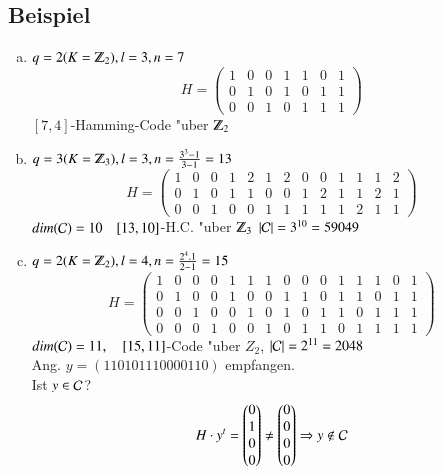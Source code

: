 %
%
\subsection{Beispiel}
\begin{enumerate}[a)]
	\item $q=2 (K= \Z_2), l=3, n=7$
	\[
	H=\begin{pmatrix}
		1 & 0 & 0 & 1 & 1 & 0 & 1 \\ 
		0 & 1 & 0 & 1 & 0 & 1 & 1 \\ 
		0 & 0 & 1 & 0 & 1 & 1 & 1
	\end{pmatrix}
	\]
	$[7,4]$-Hamming-Code "uber $\Z_2$
	\item  $q=3 (K= \Z_3), l=3, n=\frac{3^3-1}{3-1}=13$
	\[H=
	\begin{pmatrix}
		1 & 0 & 0 & 1 & 2 & 1 & 2 & 0 & 0 & 1 & 1 & 1 & 2 \\ 
		0 & 1 & 0 & 1 & 1 & 0 & 0 & 1 & 2 & 1 & 1 & 2 & 1 \\ 
		0 & 0 & 1 & 0 & 0 & 1 & 1 & 1 & 1 & 1 & 2 & 1 & 1
	\end{pmatrix}
	\]
	$dim (\mathcal{C}) = 10\quad [13,10]$-H.C. "uber $\Z_3$ $\left| \mathcal{C} \right| =3^{10}=59049$
	\item
	$q=2 (K= \Z_2), l=4, n=\frac{2^4.1}{2-1}=15$
	\[H=
	\begin{pmatrix}
		1 & 0 & 0 & 0 & 1 & 1 & 1 & 0 & 0 & 0 & 1 & 1 & 1 & 0 & 1 \\ 
		0 & 1 & 0 & 0 & 1 & 0 & 0 & 1 & 1 & 0 & 1 & 1 & 0 & 1 & 1 \\ 
		0 & 0 & 1 & 0 & 0 & 1 & 0 & 1 & 0 & 1 & 1 & 0 & 1 & 1 & 1 \\ 
		0 & 0 & 0 & 1 & 0 & 0 & 1 & 0 & 1 & 1 & 0 & 1 & 1 & 1 & 1
	\end{pmatrix} 
	\]
	$dim (\mathcal{C}) =11,\quad [15,11]$-Code "uber $Z_2$, $\left| \mathcal{C} \right| = 2^{11}=2048$\\
	Ang. $y=(110101110000110)$ empfangen.\\
	Ist $y \in \mathcal{C}$? 
	\[
		H \cdot y^t = 
		\begin{pmatrix}
			0 \\ 1 \\ 0 \\ 0
		\end{pmatrix}
		\neq
		\begin{pmatrix}
			0 \\ 0 \\ 0 \\ 0
		\end{pmatrix}
		\Rightarrow y  \notin \mathcal{C}
\]
\end{enumerate}
